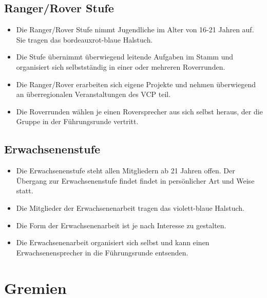 \documentclass[a4paper]{article}
\begin{document}
    \subsection{Ranger/Rover Stufe}
        \begin{itemize}
            \item Die Ranger/Rover Stufe nimmt Jugendliche im Alter von 16-21 Jahren auf. Sie tragen das bordeauxrot-blaue Halstuch.
            \item Die Stufe übernimmt überwiegend leitende Aufgaben im Stamm und organisiert sich selbstständig in einer oder mehreren Roverrunden. 
            \item Die Ranger/Rover erarbeiten sich eigene Projekte und nehmen überwiegend an überregionalen Veranstaltungen des VCP teil. 
            \item Die Roverrunden wählen je einen Roversprecher aus sich selbst heraus, der die Gruppe in der Führungsrunde vertritt.
        \end{itemize}
    
    \subsection{Erwachsenenstufe}
	\begin{itemize}
        \item Die Erwachsenenstufe steht allen Mitgliedern ab 21 Jahren offen. Der Übergang zur Erwachsenenstufe findet findet in persönlicher Art und Weise statt.
        \item Die Mitglieder der Erwachsenenarbeit tragen das violett-blaue Halstuch.
		\item Die Form der Erwachsenenarbeit ist je nach Interesse zu gestalten.
        \item Die Erwachsenenarbeit organisiert sich selbst und kann einen Erwachsenensprecher in die Führungsrunde entsenden.
	\end{itemize}

\section{Gremien}
\end{document}
